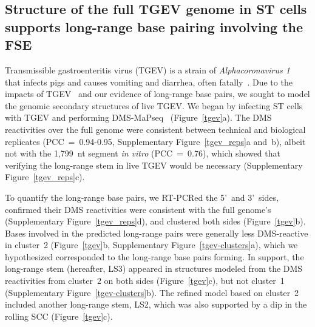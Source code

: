 \documentclass[main.tex]{subfiles}
\begin{document}
\subsection{Structure of the full TGEV genome in ST cells supports long-range base pairing involving the FSE}

Transmissible gastroenteritis virus (TGEV) is a strain of \textit{Alphacoronavirus 1}~\cite{Whittaker2018} that infects pigs and causes vomiting and diarrhea, often fatally~\cite{Liu2021}.
Due to the impacts of TGEV~\cite{Liu2021} and our evidence of long-range base pairs, we sought to model the genomic secondary structures of live TGEV.
We began by infecting ST cells with TGEV and performing DMS-MaPseq~\cite{Zubradt2016} (Figure~\ref{tgev}a).
The DMS reactivities over the full genome were consistent between technical and biological replicates (PCC~=~0.94-0.95, Supplementary Figure~\ref{tgev_reps}a and~b), albeit not with the 1,799~nt segment \textit{in vitro} (PCC~=~0.76), which showed that verifying the long-range stem in live TGEV would be necessary (Supplementary Figure~\ref{tgev_reps}c).

To quantify the long-range base pairs, we RT-PCRed the 5'~and 3'~sides, confirmed their DMS reactivities were consistent with the full genome's (Supplementary Figure~\ref{tgev_reps}d), and clustered both sides (Figure~\ref{tgev}b).
Bases involved in the predicted long-range pairs were generally less DMS-reactive in cluster~2 (Figure~\ref{tgev}b, Supplementary Figure~\ref{tgev-clusters}a), which we hypothesized corresponded to the long-range base pairs forming.
In support, the long-range stem (hereafter, LS3) appeared in structures modeled from the DMS reactivities from cluster~2 on both sides (Figure~\ref{tgev}c), but not cluster~1 (Supplementary Figure~\ref{tgev-clusters}b).
The refined model based on cluster~2 included another long-range stem, LS2, which was also supported by a dip in the rolling SCC (Figure~\ref{tgev}c).
\end{document}
